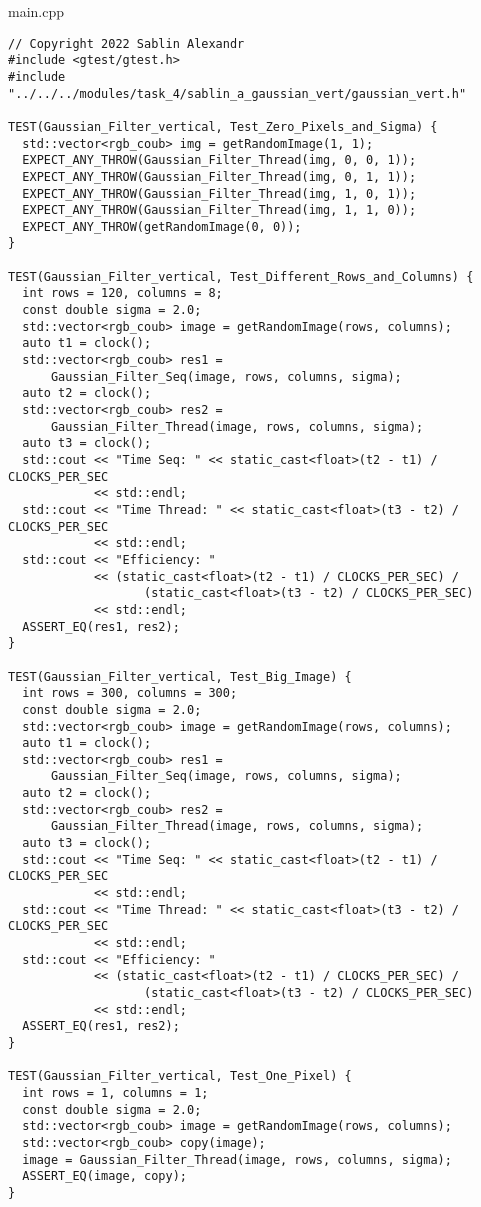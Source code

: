 \documentclass{report}
\begin{document}
main.cpp
\begin{lstlisting}
// Copyright 2022 Sablin Alexandr
#include <gtest/gtest.h>
#include "../../../modules/task_4/sablin_a_gaussian_vert/gaussian_vert.h"

TEST(Gaussian_Filter_vertical, Test_Zero_Pixels_and_Sigma) {
  std::vector<rgb_coub> img = getRandomImage(1, 1);
  EXPECT_ANY_THROW(Gaussian_Filter_Thread(img, 0, 0, 1));
  EXPECT_ANY_THROW(Gaussian_Filter_Thread(img, 0, 1, 1));
  EXPECT_ANY_THROW(Gaussian_Filter_Thread(img, 1, 0, 1));
  EXPECT_ANY_THROW(Gaussian_Filter_Thread(img, 1, 1, 0));
  EXPECT_ANY_THROW(getRandomImage(0, 0));
}

TEST(Gaussian_Filter_vertical, Test_Different_Rows_and_Columns) {
  int rows = 120, columns = 8;
  const double sigma = 2.0;
  std::vector<rgb_coub> image = getRandomImage(rows, columns);
  auto t1 = clock();
  std::vector<rgb_coub> res1 =
      Gaussian_Filter_Seq(image, rows, columns, sigma);
  auto t2 = clock();
  std::vector<rgb_coub> res2 =
      Gaussian_Filter_Thread(image, rows, columns, sigma);
  auto t3 = clock();
  std::cout << "Time Seq: " << static_cast<float>(t2 - t1) / CLOCKS_PER_SEC
            << std::endl;
  std::cout << "Time Thread: " << static_cast<float>(t3 - t2) / CLOCKS_PER_SEC
            << std::endl;
  std::cout << "Efficiency: "
            << (static_cast<float>(t2 - t1) / CLOCKS_PER_SEC) /
                   (static_cast<float>(t3 - t2) / CLOCKS_PER_SEC)
            << std::endl;
  ASSERT_EQ(res1, res2);
}

TEST(Gaussian_Filter_vertical, Test_Big_Image) {
  int rows = 300, columns = 300;
  const double sigma = 2.0;
  std::vector<rgb_coub> image = getRandomImage(rows, columns);
  auto t1 = clock();
  std::vector<rgb_coub> res1 =
      Gaussian_Filter_Seq(image, rows, columns, sigma);
  auto t2 = clock();
  std::vector<rgb_coub> res2 =
      Gaussian_Filter_Thread(image, rows, columns, sigma);
  auto t3 = clock();
  std::cout << "Time Seq: " << static_cast<float>(t2 - t1) / CLOCKS_PER_SEC
            << std::endl;
  std::cout << "Time Thread: " << static_cast<float>(t3 - t2) / CLOCKS_PER_SEC
            << std::endl;
  std::cout << "Efficiency: "
            << (static_cast<float>(t2 - t1) / CLOCKS_PER_SEC) /
                   (static_cast<float>(t3 - t2) / CLOCKS_PER_SEC)
            << std::endl;
  ASSERT_EQ(res1, res2);
}

TEST(Gaussian_Filter_vertical, Test_One_Pixel) {
  int rows = 1, columns = 1;
  const double sigma = 2.0;
  std::vector<rgb_coub> image = getRandomImage(rows, columns);
  std::vector<rgb_coub> copy(image);
  image = Gaussian_Filter_Thread(image, rows, columns, sigma);
  ASSERT_EQ(image, copy);
}


\end{lstlisting}
\end{document}
